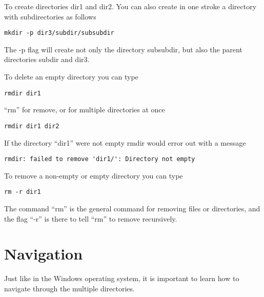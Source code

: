 \documentclass[aps,showpacs,prd,notitlepage,preprintnumbers,amsmath,amssymb,letterpaper]{revtex4}
\begin{document}
To create directories dir1 and dir2. You can also create in one stroke a directory with subdirectories as follows

\begin{verbatim}
mkdir -p dir3/subdir/subsubdir
\end{verbatim}

The -p flag will create not only the directory subsubdir, but also the parent directories subdir and dir3.

To delete an empty directory you can type

\begin{verbatim}
rmdir dir1
\end{verbatim}

``rm'' for remove, or for multiple directories at once

\begin{verbatim}
rmdir dir1 dir2
\end{verbatim}

If the directory ``dir1'' were not empty rmdir would error out with a message

\begin{verbatim}
rmdir: failed to remove 'dir1/': Directory not empty
\end{verbatim}

To remove a non-empty or empty directory you can type

\begin{verbatim}
rm -r dir1
\end{verbatim}

The command ``rm'' is the general command for removing files or directories, and the flag ``-r'' is there to tell ``rm'' to remove recursively.

\section{Navigation}

Just like in the Windows operating system, it is important to learn
how to navigate through the multiple directories.
\end{document}
